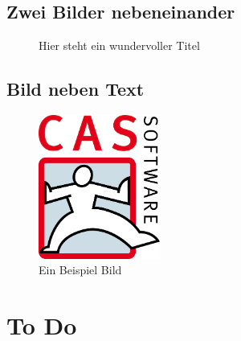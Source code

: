\subsection{Zwei Bilder nebeneinander}
\begin{figure}[H]
	\centering
	\hspace{1em} %
	
	\caption{Hier steht ein wundervoller Titel}
	\label{Image:Beispiel2}
\end{figure}

\subsection{Bild neben Text}
\begin{figure}
	\centering
	\includegraphics[width=4cm]{kapitel/offizielles/img/cas}
	\caption{Ein Beispiel Bild}
	\label{Image:Beispielbild-Rechts}
\end{figure}
\blindtext

\section{To Do}

